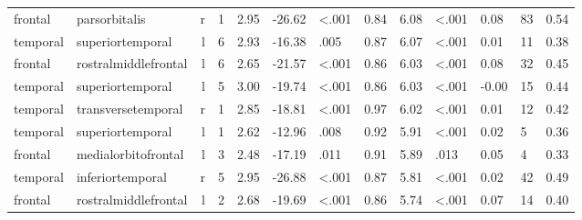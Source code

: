 \documentclass{article}
\begin{document}
\begin{longtable}{llrR{1.3cm}R{1cm}R{1.3cm}R{1cm}R{1cm}R{1.3cm}R{1cm}R{1.8cm}R{1.3cm}R{1.8cm}}
   frontal &             parsorbitalis &    r &         1 &                  2.95 &           -26.62 &      \textless.001 &                               0.84 &                          6.08 &                   \textless.001 &   0.08 &     83 &      0.54 \\
  temporal &          superiortemporal &    l &         6 &                  2.93 &           -16.38 &               .005 &                               0.87 &                          6.07 &                   \textless.001 &   0.01 &     11 &      0.38 \\
   frontal &      rostralmiddlefrontal &    l &         6 &                  2.65 &           -21.57 &      \textless.001 &                               0.86 &                          6.03 &                   \textless.001 &   0.08 &     32 &      0.45 \\
  temporal &          superiortemporal &    l &         5 &                  3.00 &           -19.74 &      \textless.001 &                               0.86 &                          6.03 &                   \textless.001 &  -0.00 &     15 &      0.44 \\
  temporal &        transversetemporal &    r &         1 &                  2.85 &           -18.81 &      \textless.001 &                               0.97 &                          6.02 &                   \textless.001 &   0.01 &     12 &      0.42 \\
  temporal &          superiortemporal &    l &         1 &                  2.62 &           -12.96 &               .008 &                               0.92 &                          5.91 &                   \textless.001 &   0.02 &      5 &      0.36 \\
   frontal &       medialorbitofrontal &    l &         3 &                  2.48 &           -17.19 &               .011 &                               0.91 &                          5.89 &                            .013 &   0.05 &      4 &      0.33 \\
  temporal &          inferiortemporal &    r &         5 &                  2.95 &           -26.88 &      \textless.001 &                               0.87 &                          5.81 &                   \textless.001 &   0.02 &     42 &      0.49 \\
   frontal &      rostralmiddlefrontal &    l &         2 &                  2.68 &           -19.69 &      \textless.001 &                               0.86 &                          5.74 &                   \textless.001 &   0.07 &     14 &      0.40 \\

\end{longtable}
\end{document}
